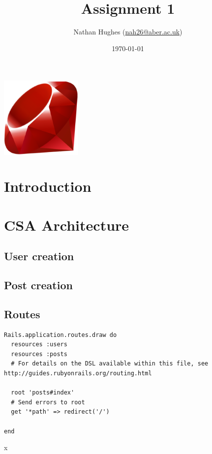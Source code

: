 \documentclass[a4paper]{article}
\author{Nathan Hughes (\href{mailto:nah31@aber.ac.uk}{nah26@aber.ac.uk})}
\date{\today}
\title{Assignment 1}
\begin{document}
\maketitle
\vspace{2cm}

\begin{center}
\includegraphics[width=4cm]{./ruby.png}
\end{center}

\clearpage
\tableofcontents
\clearpage


\section{Introduction}
\label{sec-1}

\section{CSA Architecture}
\label{sec-2}

\subsection{User creation}
\label{sec-2-1}

\subsection{Post creation}
\label{sec-2-2}

\subsection{Routes}
\label{sec-2-3}
\begin{listing}[H]
\begin{verbatim}
Rails.application.routes.draw do
  resources :users
  resources :posts
  # For details on the DSL available within this file, see http://guides.rubyonrails.org/routing.html

  root 'posts#index'
  # Send errors to root
  get '*path' => redirect('/')

end
\end{verbatim}
\caption{x}
\end{listing}
\end{document}
